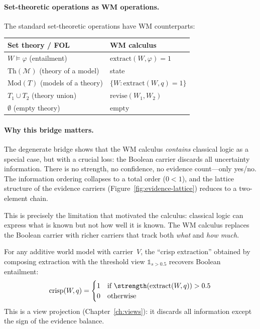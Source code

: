 \paragraph{Set-theoretic operations as WM operations.}
The standard set-theoretic operations have WM counterparts:
\begin{center}
\begin{tabular}{ll}
\toprule
\textbf{Set theory / FOL} & \textbf{WM calculus} \\
\midrule
$W \models \varphi$ (entailment) & $\mathrm{extract}(W, \varphi) = 1$ \\
$\mathrm{Th}(\mathcal{M})$ (theory of a model) & state \\
$\mathrm{Mod}(T)$ (models of a theory) & $\{W : \mathrm{extract}(W,q)=1\}$ \\
$T_1 \cup T_2$ (theory union) & $\mathrm{revise}(W_1, W_2)$ \\
$\emptyset$ (empty theory) & $\mathrm{empty}$ \\
\bottomrule
\end{tabular}
\end{center}

\paragraph{Why this bridge matters.}
The degenerate bridge shows that the WM calculus \emph{contains}
classical logic as a special case, but with a crucial loss: the
Boolean carrier discards all uncertainty information.  There is no
strength, no confidence, no evidence count---only yes/no.
The information ordering collapses to a total order ($0 < 1$), and
the lattice structure of the evidence carriers (Figure~\ref{fig:evidence-lattice})
reduces to a two-element chain.

This is precisely the limitation that motivated the calculus:
classical logic can express what is known but not how well it is
known.  The WM calculus replaces the Boolean carrier with richer
carriers that track both \emph{what} and \emph{how much}.

\begin{proposition}
\label{prop:crisp}
For any additive world model with carrier~$V$, the ``crisp
extraction'' obtained by composing extraction with the threshold
view $\mathbb{1}_{s > 0.5}$ recovers Boolean entailment:
\[
  \mathrm{crisp}(W, q) = \begin{cases}
    1 & \text{if } \strength(\mathrm{extract}(W, q)) > 0.5 \\
    0 & \text{otherwise}
  \end{cases}
\]
This is a view projection (Chapter~\ref{ch:views}): it discards
all information except the sign of the evidence balance.
\end{proposition}


